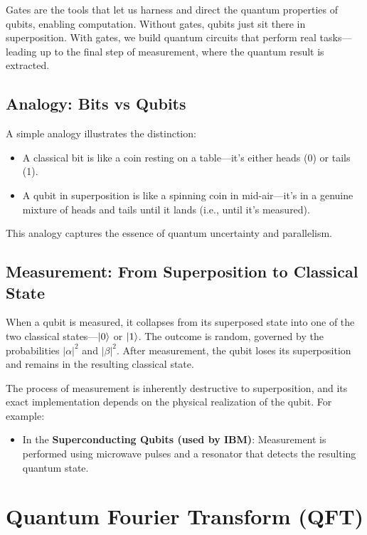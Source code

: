 \documentclass{article}
\begin{document}
Gates are the tools that let us harness and direct the quantum properties of qubits, enabling computation. Without gates, qubits just sit there in superposition. With gates, we build quantum circuits that perform real tasks—leading up to the final step of measurement, where the quantum result is extracted.

\subsection{Analogy: Bits vs Qubits}
A simple analogy illustrates the distinction:

\begin{itemize}
    \item A classical bit is like a coin resting on a table---it's either heads (0) or tails (1).
    \item A qubit in superposition is like a spinning coin in mid-air---it's in a genuine mixture of heads and tails until it lands (i.e., until it's measured).
\end{itemize}

This analogy captures the essence of quantum uncertainty and parallelism.

\subsection{Measurement: From Superposition to Classical State}
When a qubit is measured, it collapses from its superposed state into one of the two classical states---$\ket{0}$ or $\ket{1}$. The outcome is random, governed by the probabilities $|\alpha|^2$ and $|\beta|^2$. After measurement, the qubit loses its superposition and remains in the resulting classical state.

The process of measurement is inherently destructive to superposition, and its exact implementation depends on the physical realization of the qubit. For example:

\begin{itemize}
    \item In the \textbf{Superconducting Qubits (used by IBM)}: Measurement is performed using microwave pulses and a resonator that detects the resulting quantum state.
\end{itemize}


\section{Quantum Fourier Transform (QFT)}
\end{document}
